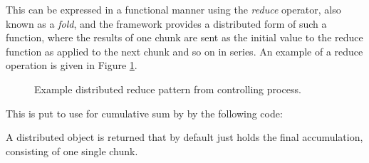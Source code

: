 This can be expressed in a functional manner using the \textit{reduce} operator, also known as a \textit{fold}, and the  framework provides a distributed form of such a function, where the results of one chunk are sent as the initial value to the reduce function as applied to the next chunk and so on in series.
An example of a reduce operation is given in Figure \cref{fig:dreduce}.

\begin{figure}[ht]
\begin{center}
    
\caption{Example distributed reduce pattern from controlling process.}
\label{fig:dreduce}
\end{center}
\end{figure}

This is put to use for cumulative sum by  by the following code:


A distributed object is returned that by default just holds the final accumulation, consisting of one single chunk.
